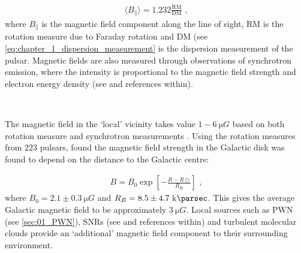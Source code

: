 \begin{equation}
    \begin{aligned}
    \langle B_\parallel \rangle = 1.232 \frac{\text{RM}}{\text{DM}}\text{ ,}
    \end{aligned}
\end{equation}
\noindent where $B_\parallel$ is the magnetic field component along the line of sight, RM is the rotation measure due to Faraday rotation and DM (see \autoref{eq:chapter_1_dispersion_measurement} is the dispersion measurement of the pulsar. Magnetic fields are also measured through observations of synchrotron emission, where the intensity is proportional to the magnetic field strength and electron energy density (see \cite{2013pss5.book..641B} and references within).
\par~\par 
The magnetic field in the `local' vicinity takes value $1-6~\si{\micro G}$ based on both rotation measure and synchrotron measurements  \citep{1989ApJ...343..760R,2001SSRv...99..243B}.  Using the rotation measures from $223$ pulsars, \cite{2006ApJ...642..868H} found the magnetic field strength in the Galactic disk was found to depend on the distance to the Galactic centre:

\begin{equation}
    \begin{aligned}
        B=B_0\exp[-\frac{R-R\odot}{R_B }]\text{ ,}
    \end{aligned}
\end{equation}
where $B_0=2.1\pm 0.3~\si{\micro G}$ and $R_B=8.5\pm 4.7~\kpc$. This gives the average Galactic magnetic field to be approximately $ 3~\si{\micro G}$. Local sources such as PWN (see \autoref{sec:01_PWN}), SNRs (see \citep{2012SSRv..166..231R} and references within) and turbulent molecular clouds \citep{2010ApJ...725..466C} provide an `additional' magnetic field component to their surrounding environment.

